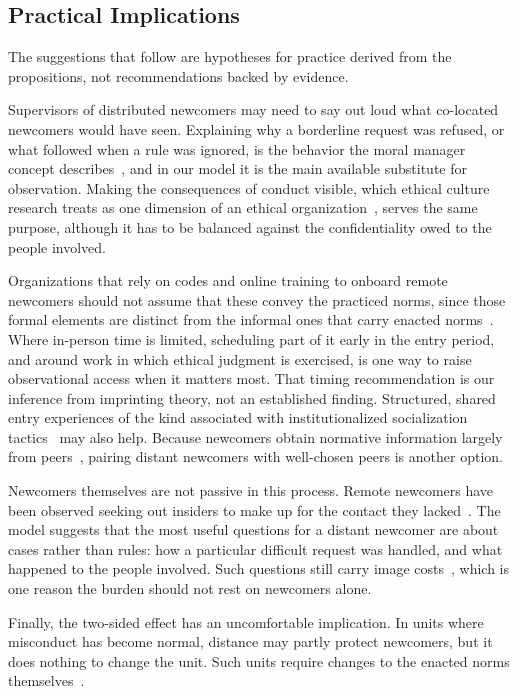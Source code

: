 \documentclass[12pt,a4paper]{article}
\theoremstyle{definition}
\begin{document}
\subsection{Practical Implications}

The suggestions that follow are hypotheses for practice derived from the propositions, not recommendations backed by evidence.

Supervisors of distributed newcomers may need to say out loud what co-located newcomers would have seen. Explaining why a borderline request was refused, or what followed when a rule was ignored, is the behavior the moral manager concept describes~\citep{trevino2000moral}, and in our model it is the main available substitute for observation. Making the consequences of conduct visible, which ethical culture research treats as one dimension of an ethical organization~\citep{kaptein2008developing}, serves the same purpose, although it has to be balanced against the confidentiality owed to the people involved.

Organizations that rely on codes and online training to onboard remote newcomers should not assume that these convey the practiced norms, since those formal elements are distinct from the informal ones that carry enacted norms~\citep{tenbrunsel2003building}. Where in-person time is limited, scheduling part of it early in the entry period, and around work in which ethical judgment is exercised, is one way to raise observational access when it matters most. That timing recommendation is our inference from imprinting theory, not an established finding. Structured, shared entry experiences of the kind associated with institutionalized socialization tactics~\citep{ashforth1996socialization} may also help. Because newcomers obtain normative information largely from peers~\citep{morrison1993newcomer}, pairing distant newcomers with well-chosen peers is another option.

Newcomers themselves are not passive in this process. Remote newcomers have been observed seeking out insiders to make up for the contact they lacked~\citep{paik2026membership}. The model suggests that the most useful questions for a distant newcomer are about cases rather than rules: how a particular difficult request was handled, and what happened to the people involved. Such questions still carry image costs~\citep{ashford2003reflections}, which is one reason the burden should not rest on newcomers alone.

Finally, the two-sided effect has an uncomfortable implication. In units where misconduct has become normal, distance may partly protect newcomers, but it does nothing to change the unit. Such units require changes to the enacted norms themselves~\citep{ashforth2003normalization}.
\end{document}

